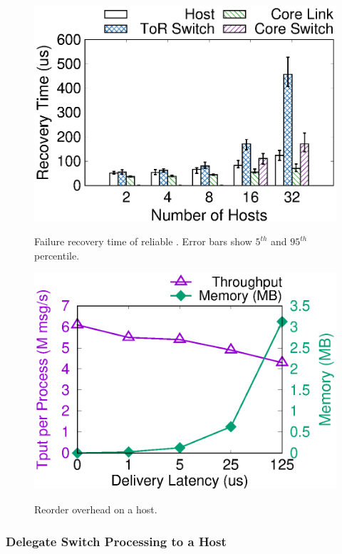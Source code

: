 \begin{figure}[t]
	\begin{minipage}[]{.32\textwidth}
		\centering
		\includegraphics[width=\textwidth]{gnuplot/failure_recovery.eps}
		\caption{Failure recovery time of reliable \sys{}. Error bars show $5^{th}$ and $95^{th}$ percentile.}
		\label{fig:failure-recovery}
		\includegraphics[width=\textwidth]{gnuplot/reorder_receiver.eps}
		\caption{Reorder overhead on a host.}
		\label{fig:reorder-overhead}
	\end{minipage}
	\vspace{-10pt}
\end{figure}


\subsubsection{Delegate Switch Processing to a Host}
\label{sec:end-host}

